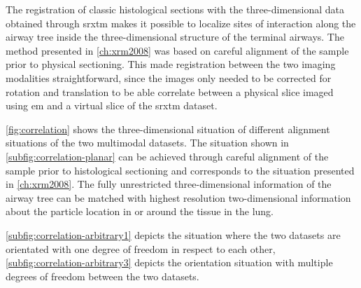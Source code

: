 The registration of classic histological sections with the three-di\-men\-sion\-al data obtained through \ac{srxtm} makes it possible to localize sites of interaction along the airway tree inside the three-dimensional structure of the terminal airways. The method presented in \autoref{ch:xrm2008} was based on careful alignment of the sample prior to physical sectioning. This made registration between the two imaging modalities straightforward, since the images only needed to be corrected for rotation and translation to be able correlate between a physical slice imaged using \ac{em} and a virtual slice of the \ac{srxtm} dataset.

\autoref{fig:correlation} shows the three-dimensional situation of different alignment situations of the two multimodal datasets. The situation shown in \autoref{subfig:correlation-planar} can be achieved through careful alignment of the sample prior to histological sectioning and corresponds to the situation presented in \autoref{ch:xrm2008}. The fully unrestricted three-dimensional information of the airway tree can be matched with highest resolution two-dimensional information about the particle location in or around the tissue in the lung.

\autoref{subfig:correlation-arbitrary1} depicts the situation where the two datasets are orientated with one degree of freedom in respect to each other, \autoref{subfig:correlation-arbitrary3} depicts the orientation situation with multiple degrees of freedom between the two datasets.

